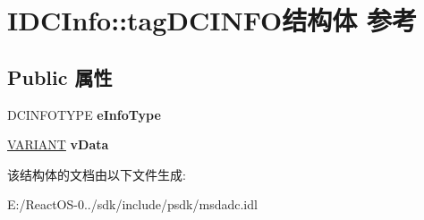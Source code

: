 \hypertarget{struct_i_d_c_info_1_1tag_d_c_i_n_f_o}{}\section{I\+D\+C\+Info\+:\+:tag\+D\+C\+I\+N\+F\+O结构体 参考}
\label{struct_i_d_c_info_1_1tag_d_c_i_n_f_o}
\subsection*{Public 属性}
\begin{DoxyCompactItemize}
\item 
\mbox{\label{struct_i_d_c_info_1_1tag_d_c_i_n_f_o_aa41a905c1be1136c33a46ed0c318a8fb}} 
D\+C\+I\+N\+F\+O\+T\+Y\+PE {\bfseries e\+Info\+Type}
\item 
\mbox{\label{struct_i_d_c_info_1_1tag_d_c_i_n_f_o_a741f2cb4b31a21c5016375b52a960900}} 
\hyperlink{structtag_v_a_r_i_a_n_t}{V\+A\+R\+I\+A\+NT} {\bfseries v\+Data}
\end{DoxyCompactItemize}


该结构体的文档由以下文件生成\+:\begin{DoxyCompactItemize}
\item 
E\+:/\+React\+O\+S-\/0../sdk/include/psdk/msdadc.\+idl\end{DoxyCompactItemize}
